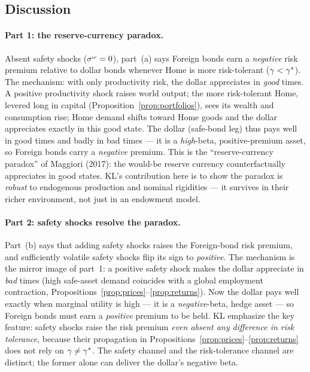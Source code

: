 \subsection{Discussion}

\paragraph{Part 1: the reserve-currency paradox.} Absent safety shocks
($\sigma^{\omega}=0$), part~(a) says Foreign bonds earn a \emph{negative} risk
premium relative to dollar bonds whenever Home is more risk-tolerant
($\gamma<\gamma^{*}$). The mechanism: with only productivity risk, the dollar appreciates
in \emph{good} times. A positive productivity shock raises world output; the more
risk-tolerant Home, levered long in capital (Proposition~\ref{prop:portfolios}),
sees its wealth and consumption rise; Home demand shifts toward Home goods and the
dollar appreciates exactly in this good state. The dollar (safe-bond leg) thus
pays well in good times and badly in bad times --- it is a \emph{high}-beta,
positive-premium asset, so Foreign bonds carry a \emph{negative} premium. This is
the ``reserve-currency paradox'' of Maggiori (2017): the would-be reserve currency
counterfactually appreciates in good states. KL's contribution here is to show the
paradox is \emph{robust} to endogenous production and nominal rigidities --- it
survives in their richer environment, not just in an endowment model.

\paragraph{Part 2: safety shocks resolve the paradox.} Part~(b) says that adding
safety shocks raises the Foreign-bond risk premium, and sufficiently volatile
safety shocks flip its sign to \emph{positive}. The mechanism is the mirror image
of part~1: a positive safety shock makes the dollar appreciate in \emph{bad} times
(high safe-asset demand coincides with a global employment contraction,
Propositions~\ref{prop:prices}--\ref{prop:returns}). Now the dollar pays well
exactly when marginal utility is high --- it is a \emph{negative}-beta, hedge
asset --- so Foreign bonds must earn a \emph{positive} premium to be held. KL
emphasize the key feature: safety shocks raise the risk premium \emph{even absent
any difference in risk tolerance}, because their propagation in
Propositions~\ref{prop:prices}--\ref{prop:returns} does not rely on
$\gamma\neq\gamma^{*}$. The safety channel and the risk-tolerance channel are distinct;
the former alone can deliver the dollar's negative beta.

